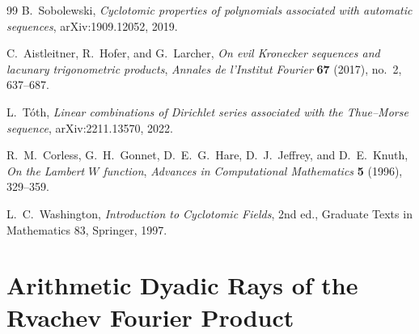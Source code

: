\documentclass[11pt,oneside]{article}
\theoremstyle{definition}
\theoremstyle{remark}
\begin{document}
\begin{thebibliography}{99}
B.~Sobolewski,
\emph{Cyclotomic properties of polynomials associated with automatic sequences},
arXiv:1909.12052, 2019.

C.~Aistleitner, R.~Hofer, and G.~Larcher,
\emph{On evil Kronecker sequences and lacunary trigonometric products},
\emph{Annales de l'Institut Fourier} \textbf{67} (2017), no.~2, 637--687.

L.~T\'oth,
\emph{Linear combinations of Dirichlet series associated with the Thue--Morse sequence},
arXiv:2211.13570, 2022.

R.~M.~Corless, G.~H.~Gonnet, D.~E.~G.~Hare, D.~J.~Jeffrey, and D.~E.~Knuth,
\emph{On the Lambert $W$ function},
\emph{Advances in Computational Mathematics} \textbf{5} (1996), 329--359.

L.~C.~Washington,
\emph{Introduction to Cyclotomic Fields}, 2nd ed.,
Graduate Texts in Mathematics 83, Springer, 1997.

\end{thebibliography}


\newcommand{\Res}{\operatorname{Res}}
\newcommand{\importedPartx}{\textcolor{importblue}{\textsc{Imported result.}}}

\setcounter{section}{0}
\renewcommand{\thesection}{\arabic{section}}
\part{Arithmetic Dyadic Rays of the Rvachev Fourier Product}
\end{document}
